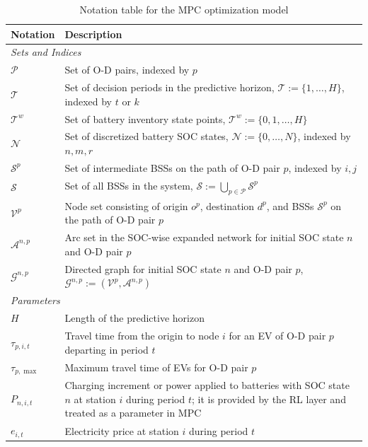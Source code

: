 \documentclass[12pt,hyperref,a4paper,UTF8]{ctexart}
\begin{document}
\begin{table}[!htbp]
  \centering
  \caption{Notation table for the MPC optimization model}
  \label{tab:notation}
  \footnotesize
  \setlength{\tabcolsep}{2pt}
  \renewcommand{\arraystretch}{0.88}
  \begin{tabular}{@{}lp{13cm}@{}}
    \toprule
    \textbf{Notation} & \textbf{Description} \\
    \midrule
    \multicolumn{2}{l}{\textit{Sets and Indices}} \\
    $\mathcal{P}$ & Set of O-D pairs, indexed by $p$ \\
    $\mathcal{T}$ & Set of decision periods in the predictive horizon, $\mathcal{T}:=\{1,\dots,H\}$, indexed by $t$ or $k$ \\
    $\mathcal{T}^{w}$ & Set of battery inventory state points, $\mathcal{T}^{w}:=\{0,1,\dots,H\}$ \\
    $\mathcal{N}$ & Set of discretized battery SOC states, $\mathcal{N}:=\{0,\dots,N\}$, indexed by $n,m,r$ \\
    $\mathcal{S}^{p}$ & Set of intermediate BSSs on the path of O-D pair $p$, indexed by $i,j$ \\
    $\mathcal{S}$ & Set of all BSSs in the system, $\mathcal{S}:=\bigcup_{p\in\mathcal{P}}\mathcal{S}^{p}$ \\
    $\mathcal{V}^{p}$ & Node set consisting of origin $o^{p}$, destination $d^{p}$, and BSSs $\mathcal{S}^{p}$ on the path of O-D pair $p$ \\
    $\mathcal{A}^{n,p}$ & Arc set in the SOC-wise expanded network for initial SOC state $n$ and O-D pair $p$ \\
    $\mathcal{G}^{n,p}$ & Directed graph for initial SOC state $n$ and O-D pair $p$, $\mathcal{G}^{n,p}:=(\mathcal{V}^{p},\mathcal{A}^{n,p})$ \\
    \midrule
    \multicolumn{2}{l}{\textit{Parameters}} \\
    $H$ & Length of the predictive horizon \\
    $\tau_{p,i,t}$ & Travel time from the origin to node $i$ for an EV of O-D pair $p$ departing in period $t$ \\
    $\tau_{p,\max}$ & Maximum travel time of EVs for O-D pair $p$ \\
    $P_{n,i,t}$ & Charging increment or power applied to batteries with SOC state $n$ at station $i$ during period $t$; it is provided by the RL layer and treated as a parameter in MPC \\
    $e_{i,t}$ & Electricity price at station $i$ during period $t$ \\

\end{tabular}
\end{table}
\end{document}
